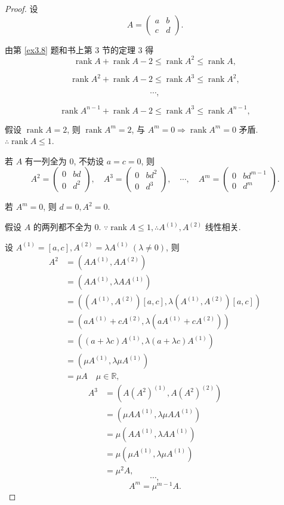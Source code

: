 \documentclass{ctexart}
\begin{document}
\begin{proof}
    设
    \[A=\begin{pmatrix}
        a & b \\
        c & d
    \end{pmatrix}.\]

    由第 \ref{ex3.8} 题和书上第 3 节的定理 3 得
    \[\operatorname{rank}A+\operatorname{rank}A-2\leq\operatorname{rank}A^2\leq\operatorname{rank}A,\]

    \[\operatorname{rank}A^2+\operatorname{rank}A-2\leq\operatorname{rank}A^3\leq\operatorname{rank}A^2,\]

    \[\cdots,\]

    \[\operatorname{rank}A^{n-1}+\operatorname{rank}A-2\leq\operatorname{rank}A^3\leq\operatorname{rank}A^{n-1},\]

    假设 $\operatorname{rank}A=2$, 则 $\operatorname{rank}A^m=2$, 与 $A^m=0\Rightarrow\operatorname{rank}A^m=0$ 矛盾. $\therefore\operatorname{rank}A\leq 1$.

    若 $A$ 有一列全为 $0$, 不妨设 $a=c=0$, 则
    \[A^2=\begin{pmatrix}
        0 & bd \\
        0 & d^2
    \end{pmatrix},\quad A^3=\begin{pmatrix}
        0 & bd^2 \\
        0 & d^3
    \end{pmatrix},\quad\cdots,\quad A^m=\begin{pmatrix}
        0 & bd^{m-1} \\
        0 & d^m
    \end{pmatrix}.\]

    若 $A^m=0$, 则 $d=0,A^2=0$.

    假设 $A$ 的两列都不全为 $0$. $\because\operatorname{rank}A\leq1,\therefore A^{(1)},A^{(2)}$ 线性相关.

    设 $A^{(1)}=[a,c],A^{(2)}=\lambda A^{(1)}\ (\lambda\neq0)$, 则
    \begin{align*}
        A^2 & =(AA^{(1)},AA^{(2)}) \\
        & =(AA^{(1)},\lambda AA^{(1)}) \\
        & =((A^{(1)},A^{(2)})[a,c],\lambda(A^{(1)},A^{(2)})[a,c]) \\
        & =(aA^{(1)}+cA^{(2)},\lambda(aA^{(1)}+cA^{(2)})) \\
        & =((a+\lambda c)A^{(1)},\lambda(a+\lambda c)A^{(1)}) \\
        & =(\mu A^{(1)},\lambda\mu A^{(1)}) \\
        & =\mu A\quad\mu \in\mathbb{R},
    \end{align*}
    \begin{align*}
        A^3 & =(A(A^2)^{(1)},A(A^2)^{(2)}) \\
        & =(\mu AA^{(1)},\lambda\mu AA^{(1)}) \\
        & =\mu(AA^{(1)},\lambda AA^{(1)}) \\
        & =\mu(\mu A^{(1)},\lambda\mu A^{(1)}) \\
        & =\mu^2 A,
    \end{align*}
    \[\cdots,\]
    \[A^m=\mu^{m-1} A.\]


\end{proof}
\end{document}

